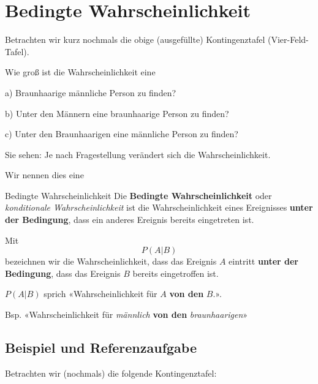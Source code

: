 
\section{Bedingte Wahrscheinlichkeit}

Betrachten wir kurz nochmals die obige (ausgefüllte) Kontingenztafel (Vier-Feld-Tafel).

Wie groß ist die Wahrscheinlichkeit eine

a) Braunhaarige männliche Person zu finden? 

b) Unter den Männern eine braunhaarige Person zu finden? 

c) Unter den Braunhaarigen eine männliche Person zu finden? 

Sie sehen: Je nach Fragestellung verändert sich die Wahrscheinlichkeit.

Wir nennen dies eine

\begin{definition}{Bedingte Wahrscheinlichkeit}{}
Die \textbf{Bedingte Wahrscheinlichkeit} oder \textit{konditionale
  Wahrscheinlichkeit} ist die Wahrscheinlichkeit eines Ereignisses
\textbf{unter der Bedingung}, dass ein anderes Ereignis bereits
eingetreten ist.
  \end{definition}

\begin{definition}{}{}
  Mit
  $$P(A | B)$$
  bezeichnen wir die Wahrscheinlichkeit, dass das Ereignis $A$
  eintritt \textbf{unter der Bedingung}, dass das Ereignis $B$ bereits
  eingetroffen ist.
\end{definition}

\begin{bemerkung}{}{}
  $P(A|B)$ sprich «Wahrscheinlichkeit für $A$ \textbf{von den} $B$.».

  Bsp. «Wahrscheinlichkeit für \textit{männlich} \textbf{von den} \textit{braunhaarigen}»  
\end{bemerkung}

\newpage


\subsection{Beispiel und Referenzaufgabe}
Betrachten wir (nochmals) die folgende Kontingenztafel:

